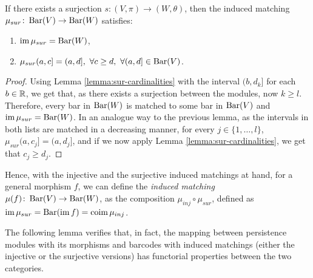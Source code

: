 \begin{lemma} \label{lemma:sur-matching}
    If there exists a surjection $s\colon (V, \pi) \to (W, \theta) $, then the induced matching $ \mu_{sur}\colon \operatorname{Bar}(V) \to \operatorname{Bar} (W) $ satisfies:
    \begin{enumerate}
        \item $\operatorname{im} \mu_{sur} = \operatorname{Bar}(W)$,
        \item $\mu_{sur}(a, c] = (a, d], \ \forall c \geq d, \ \forall (a, d] \in \operatorname{Bar}(V)$.
    \end{enumerate}
\end{lemma}
\begin{proof}
    Using Lemma \ref{lemma:sur-cardinalities} with the interval $(b, d_k]$ for each $ b \in \mathbb R $, we get that, as there exists a surjection between the modules, now $ k \geq l $. Therefore, every bar in $\operatorname{Bar}(W)$ is matched to some bar in $\operatorname{Bar}(V)$ and $\operatorname{im} \mu_{sur} = \operatorname{Bar}(W)$. In an analogue way to the previous lemma, as the intervals in both lists are matched in a decreasing manner, for every $j \in \{1, \dots, l\} $, $\mu_{sur}(a, c_j] = (a, d_j] $, and if we now apply Lemma \ref{lemma:sur-cardinalities}, we get that $ c_j \geq d_j $.
\end{proof}

Hence, with the injective and the surjective induced matchings at hand, for a general morphism $ f $, we can define the {\it induced matching} $ \mu (f) \colon \operatorname{Bar}(V) \to \operatorname{Bar}(W) $, as the composition $ \mu_{inj} \circ \mu_{sur} $, defined as $ \operatorname{im} \mu_{sur} = \operatorname{Bar}(\operatorname{im} f) = \operatorname{coim} \mu_{inj} $.

The following lemma verifies that, in fact, the mapping between persistence modules with its morphisms and barcodes with induced matchings (either the injective or the surjective versions) has functorial properties between the two categories.

